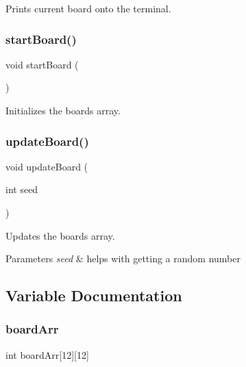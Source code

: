 Prints current board onto the terminal. 

\mbox{\label{group__board_ga978d4c9242b0a08ccba7244855a6fd34}} 
\subsubsection{\texorpdfstring{startBoard()}{startBoard()}}
{\footnotesize\ttfamily void start\+Board (\begin{DoxyParamCaption}{ }\end{DoxyParamCaption})}



Initializes the board\textquotesingle{}s array. 

\mbox{\label{group__board_ga8cfe09094cdbdece93ee59c05c3c9375}} 
\subsubsection{\texorpdfstring{updateBoard()}{updateBoard()}}
{\footnotesize\ttfamily void update\+Board (\begin{DoxyParamCaption}\item[{int}]{seed }\end{DoxyParamCaption})}



Updates the board\textquotesingle{}s array. 


\begin{DoxyParams}{Parameters}
{\em seed} & helps with getting a random number \\
\hline
\end{DoxyParams}


\subsection{Variable Documentation}
\mbox{\label{group__board_ga71c192646429486a7ac23c7805a8ed6c}} 
\subsubsection{\texorpdfstring{boardArr}{boardArr}}
{\footnotesize\ttfamily int board\+Arr\mbox{[}12\mbox{]}\mbox{[}12\mbox{]}}

